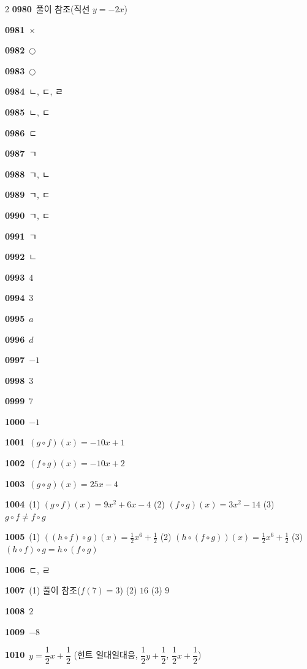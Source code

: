 \documentclass[10pt,a4paper]{article}
\begin{document}
\begin{multicols}{2}
\noindent\textbf{0980}\ 풀이 참조(직선 $y=-2x$)\par
\noindent\textbf{0981}\ $\times$\par
\noindent\textbf{0982}\ $\bigcirc$\par
\noindent\textbf{0983}\ $\bigcirc$\par
\noindent\textbf{0984}\ ㄴ, ㄷ, ㄹ\par
\noindent\textbf{0985}\ ㄴ, ㄷ\par
\noindent\textbf{0986}\ ㄷ\par
\noindent\textbf{0987}\ ㄱ\par
\noindent\textbf{0988}\ ㄱ, ㄴ\par
\noindent\textbf{0989}\ ㄱ, ㄷ\par
\noindent\textbf{0990}\ ㄱ, ㄷ\par
\noindent\textbf{0991}\ ㄱ\par
\noindent\textbf{0992}\ ㄴ\par
\noindent\textbf{0993}\ $4$\par
\noindent\textbf{0994}\ $3$\par
\noindent\textbf{0995}\ $a$\par
\noindent\textbf{0996}\ $d$\par
\noindent\textbf{0997}\ $-1$\par
\noindent\textbf{0998}\ $3$\par
\noindent\textbf{0999}\ $7$\par
\noindent\textbf{1000}\ $-1$\par
\noindent\textbf{1001}\ $(g\circ f)(x)=-10x+1$\par
\noindent\textbf{1002}\ $(f\circ g)(x)=-10x+2$\par
\noindent\textbf{1003}\ $(g\circ g)(x)=25x-4$\par
\noindent\textbf{1004}\ (1) $(g\circ f)(x)=9x^2+6x-4$ (2) $(f\circ g)(x)=3x^2-14$ (3) $g\circ f\ne f\circ g$\par
\noindent\textbf{1005}\ (1) $((h\circ f)\circ g)(x)=\frac{1}{2}x^6+\frac{1}{2}$ (2) $(h\circ(f\circ g))(x)=\frac{1}{2}x^6+\frac{1}{2}$ (3) $(h\circ f)\circ g=h\circ(f\circ g)$\par
\noindent\textbf{1006}\ ㄷ, ㄹ\par
\noindent\textbf{1007}\ (1) 풀이 참조($f(7)=3$) (2) $16$ (3) $9$\par
\noindent\textbf{1008}\ $2$\par
\noindent\textbf{1009}\ $-8$\par
\noindent\textbf{1010}\ $y=\dfrac{1}{2}x+\dfrac{1}{2}$ (힌트 일대일대응, $\dfrac{1}{2}y+\dfrac{1}{2}$, $\dfrac{1}{2}x+\dfrac{1}{2}$)\par

\end{multicols}
\end{document}
